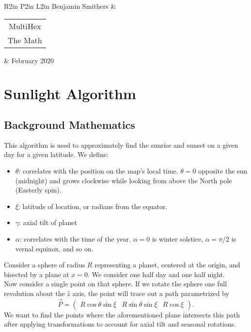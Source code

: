\documentclass[12pt,a4paper]{article}
\begin{document}
\begin{table}
	\centering
	\begin{tabular}{R{2in} P{2in} L{2in}}
		Benjamin Smithers & \begin{tabular}{c}{\Large MultiHex} \\ {\Large The Math}  \end{tabular} & February 2020 \\\hline
	\end{tabular}

\end{table}

\section{Sunlight Algorithm}

\subsection{Background Mathematics}

This algorithm is used to approximately find the sunrise and sunset on a given day for a given latitude. We define:
\begin{itemize}
	\item \(\theta\): correlates with the position on the map's local time. \(\theta=0\) opposite the sun (midnight) and grows clockwise while looking from above the North pole (Easterly spin). 
	\item \(\xi\): latitude of location, or radians from the equator. 
	\item \(\gamma\): axial tilt of planet
	\item \(\alpha\): correlates with the time of the year. \(\alpha=0\) is winter solstice, \(\alpha=\pi/2\) is vernal equinox, and so on.
\end{itemize}
Consider a sphere of radius \(R\) representing a planet, centered at the origin, and bisected by a plane at \(x=0\). We consider one half day and one half night. \\

Now consider a single point on that sphere. If we rotate the sphere one full revolution about the \(\hat{z}\) axis, the point will trace out a path parametrized by
\begin{equation}
\vec{P} = \left(\begin{array}{ccc} R\cos\theta\sin\xi & R\sin\theta\sin\xi & R\cos\xi \end{array}\right).
\end{equation}
We want to find the points where the aforementioned plane intersects this path after applying transformations to account for axial tilt and seasonal rotations. \\
\end{document}
